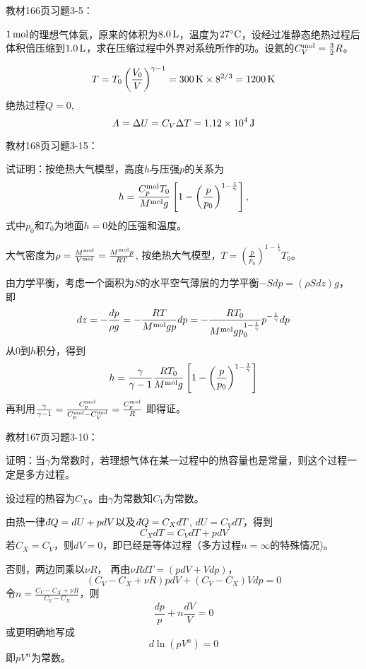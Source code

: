\documentclass[CJK]{beamer}
\begin{document}
\begin{frame}
  \chtitle{\proid (\sone)}
  \bch
  教材166页习题3-5：

  $1\,\mathrm{mol}$的理想气体氦，原来的体积为$8.0\,\mathrm{L}$，温度为$27^\circ \mathrm{C}$，设经过准静态绝热过程后体积倍压缩到$1.0\,\mathrm{L}$，求在压缩过程中外界对系统所作的功。设氦的$C_V^{\rm mol} = \frac{3}{2}R$。
  \ech
\end{frame}

\begin{frame}
  \bch
  $$T=T_0\left(\frac{V_0}{V}\right)^{\gamma-1} = 300\,\mathrm{K}\times 8^{2/3} = 1200\,\mathrm{K} $$
  绝热过程$Q=0$,
  $$A = \Delta U =C_V\Delta T  = 1.12\times 10^4\,\mathrm{J}$$
  \ech
\end{frame}

\begin{frame}
  \chtitle{\proid (\sthree)}
  \bch
  教材168页习题3-15：

  试证明：按绝热大气模型，高度$h$与压强$p$的关系为
  $$ h = \frac{C_p^{\rm mol}T_0}{M^{\rm mol}g}\left[1-\left(\frac{p}{p_0}\right)^{1-\frac{1}{\gamma}}\right],$$
  式中$p_0$和$T_0$为地面$h=0$处的压强和温度。
  \ech
\end{frame}

\begin{frame}
  \bch
  {\small
    大气密度为$ \rho = \frac{M^{\rm mol}}{V^{\rm mol}} = \frac{M^{\rm mol}p}{RT} $,   按绝热大气模型，$T = \left(\frac{p}{p_0}\right)^{1-\frac{1}{\gamma}} T_0$。
    
  由力学平衡，考虑一个面积为$S$的水平空气薄层的力学平衡$-S dp = (\rho S dz)g $， 即
  $$ dz =-\frac{dp}{\rho g} = -\frac{RT }{M^{\rm mol}gp}dp= -\frac{RT_0}{M^{\rm mol}gp_0^{1-\frac{1}{\gamma}}} p^{-\frac{1}{\gamma}} dp$$
  从$0$到$h$积分，得到
  $$ h = \frac{\gamma}{\gamma-1}\frac{RT_0}{M^{\rm mol}g}\left[1-\left(\frac{p}{p_0}\right)^{1-\frac{1}{\gamma}}\right]$$
  再利用$\frac{\gamma}{\gamma-1} = \frac{C_p^{\rm mol}}{C_p^{\rm mol}-C_V^{\rm mol}} = \frac{C_p^{\rm mol}}{R}$
    即得证。
  }
  \ech
\end{frame}

\begin{frame}
  \chtitle{\proid (\stwo)}
  \bch
  教材167页习题3-10：

  证明：当$\gamma$为常数时，若理想气体在某一过程中的热容量也是常量，则这个过程一定是多方过程。
  \ech
\end{frame}


\begin{frame}
  \bch
  {\small
  设过程的热容为$C_X$。由$\gamma$为常数知$C_V$为常数。

  由热一律$\dbar Q = dU + pdV$以及$\dbar Q = C_X dT$, $dU = C_V dT$，得到
  $$ C_X dT = C_V dT + p dV$$
  若$C_X = C_V$，则$dV = 0$，即已经是等体过程（多方过程$n=\infty$的特殊情况)。
    
    否则，两边同乘以$\nu R$， 再由$\nu R dT =  (pdV + Vdp) $，
  $$ (C_V-C_X + \nu R) pdV + (C_V-C_X) Vdp = 0$$
  令$n =\frac{C_V-C_X + \nu R}{C_V-C_X }$，则
  $$ \frac{dp}{p} + n\frac{dV}{V} = 0$$
  或更明确地写成
  $$ d \ln (pV^n) = 0$$
  即$pV^n$为常数。
  }
  \ech
\end{frame}
\end{document}
